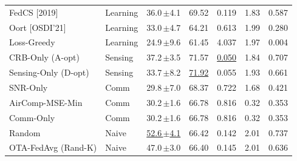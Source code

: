 \begin{tabular}{@{}l l c c c c c@{}}
FedCS [2019] & Learning & 36.0\,\footnotesize$\pm$4.1 & 69.52 & 0.119 & 1.83 & 0.587 \\
Oort [OSDI'21] & Learning & 33.0\,\footnotesize$\pm$4.7 & 64.21 & 0.613 & 1.99 & 0.280 \\
Loss-Greedy & Learning & 24.9\,\footnotesize$\pm$9.6 & 61.45 & 4.037 & 1.97 & 0.004 \\
\midrule
CRB-Only (A-opt) & Sensing & 37.2\,\footnotesize$\pm$3.5 & 71.57 & \underline{0.050} & 1.84 & 0.707 \\
Sensing-Only (D-opt) & Sensing & 33.7\,\footnotesize$\pm$8.2 & \underline{71.92} & 0.055 & 1.93 & 0.661 \\
\midrule
SNR-Only & Comm & 29.8\,\footnotesize$\pm$7.0 & 68.37 & 0.722 & 1.68 & 0.421 \\
AirComp-MSE-Min & Comm & 30.2\,\footnotesize$\pm$1.6 & 66.78 & 0.816 & 0.32 & 0.353 \\
Comm-Only & Comm & 30.2\,\footnotesize$\pm$1.6 & 66.78 & 0.816 & 0.32 & 0.353 \\
\midrule
Random & Naive & \underline{52.6\,\footnotesize$\pm$4.1} & 66.42 & 0.142 & 2.01 & 0.737 \\
OTA-FedAvg (Rand-K) & Naive & 47.0\,\footnotesize$\pm$3.0 & 66.40 & 0.145 & 2.01 & 0.636 \\
\bottomrule
\end{tabular}